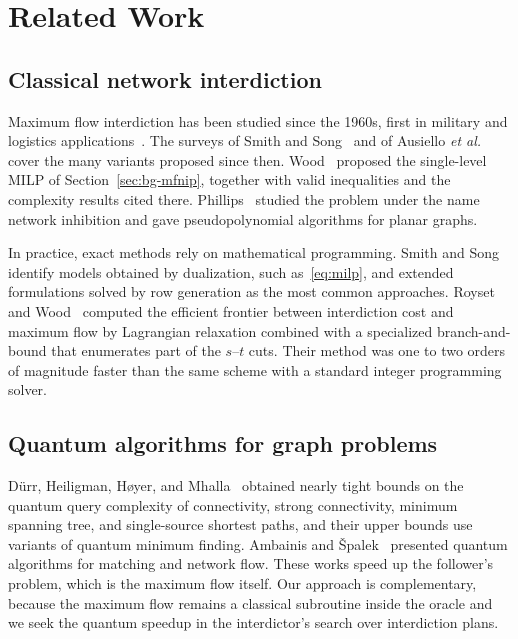 \section{Related Work}\label{sec:related}

\subsection{Classical network interdiction}\label{sec:rel-classical}

Maximum flow interdiction has been studied since the 1960s, first in military and logistics applications~\cite{ausiello2026}. The surveys of Smith and Song~\cite{smith2020} and of Ausiello \emph{et al.}~\cite{ausiello2026} cover the many variants proposed since then. Wood~\cite{wood1993} proposed the single-level MILP of Section~\ref{sec:bg-mfnip}, together with valid inequalities and the complexity results cited there. Phillips~\cite{phillips1993} studied the problem under the name network inhibition and gave pseudopolynomial algorithms for planar graphs.

In practice, exact methods rely on mathematical programming. Smith and Song~\cite{smith2020} identify models obtained by dualization, such as~\eqref{eq:milp}, and extended formulations solved by row generation as the most common approaches. Royset and Wood~\cite{royset2007} computed the efficient frontier between interdiction cost and maximum flow by Lagrangian relaxation combined with a specialized branch-and-bound that enumerates part of the $s$--$t$ cuts. Their method was one to two orders of magnitude faster than the same scheme with a standard integer programming solver.

\subsection{Quantum algorithms for graph problems}\label{sec:rel-graphs}

D\"urr, Heiligman, H{\o}yer, and Mhalla~\cite{durr2006} obtained nearly tight bounds on the quantum query complexity of connectivity, strong connectivity, minimum spanning tree, and single-source shortest paths, and their upper bounds use variants of quantum minimum finding. Ambainis and \v{S}palek~\cite{ambainis2006} presented quantum algorithms for matching and network flow. These works speed up the follower's problem, which is the maximum flow itself. Our approach is complementary, because the maximum flow remains a classical subroutine inside the oracle and we seek the quantum speedup in the interdictor's search over interdiction plans.

